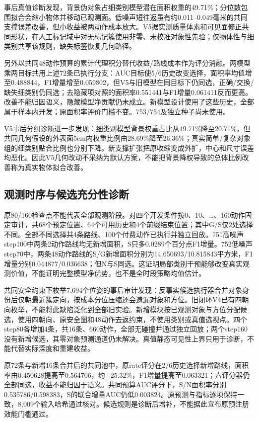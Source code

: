 \documentclass[11pt,a4paper]{article}
\begin{document}
事后真值诊断发现，背景伪对象占细类别模型潜在面积权重的49.71\%；分位数包围拟合会缩小物体并移动已观测面。低噪声短往返虽有约0.011--0.049毫米的共同支撑误差改善，但小收益被两动作成本放大。V5据实测质量体素和可见面修正共同形状，在人工标记域中对无标记簇使用非零、未校准对象性先验；仅物体性与细类别共享该规则，缺失标签恢复几何路径。

另外以共同48动作预算的累计代理积分替代收益/路线成本作为评分消融。两模型乘两目标共用上述72条已执行分支：AUC目标使5/6历史改变选择，面积率均值增至0.488844，F1增量增至0.059802，但V5与旧模型在同目标下仍同选，正确/交换/缺失细类别仍同选；去隐藏项对照的面积率0.551441与F1增量0.061411反而更高。改善不能归因语义，隐藏模型净贡献仍未成立。新模型设计使用了这些历史，全部属于样本内开发；原面积率评价门槛不变。753/754及独立种子尚未使用。

V5事后分组诊断进一步发现：细类别模型背景权重占比从49.71\%降至20.71\%，但共同几何假设的外表面5cm内权重比例由28.69\%降至26.36\%；真实简单/复杂对象组的细类别贴合比例也分别下降。新支撑扩张把原收缩变成外扩，中心和尺寸误差均恶化。因此V5几何改动不采纳为默认方案，不能把背景降权导致的总体比例改善称为真实物体拟合改善。

\subsection{观测时序与候选充分性诊断}
原80/160检查点不能代表全部观测阶段。对四个开发条件按0、10、\ldots、160动作固定审计，共68个预定位置、64个可用历史和4个前缀结束位置；其中G/S仅2处选择不同。全部不同选择共4条路线、100个付费动作已执行并独立回放。751高噪声step100中两条2动作路线均无新增面积，S只多0.0289个百分点F1增量。752低噪声step70中，两条48动作路线的S/G新增面积分别为14.650693/10.815843平方米，F1增量分别0.044877/0.036638；但N与S同选。这证明局部类别干预能够改变真实观测价值，不能证明完整模型净优势，也不是全时段策略均值估计。

共同安全约束下枚举7,694个位姿的事后审计发现：反事实候选执行器合并对象身份后仅朝最近簇定向，按成本分位压缩还会遗漏对象和方位。旧闭环V4已有四朝向枚举，不能将此缺陷泛化到全部旧实验。新增模块按已观测对象与方位分配候选，使用四朝向、原安全图和48动作去返约束，不使用类别或真值选视点。四个step80各增加4条，共16条、660动作，全部无碰撞并通过独立回放；两个step160没有新增候选，其零对象预测通道仍未解决。真值静态可见性上界只用于诊断，不能代替实际深度和重建收益。

原72条与新增16条合并后的共同池中，原rate评分在2/6历史选择新增路线，面积率由0.450628提高至0.564706，约$+25.32\%$，F1增量提高至0.063321；六评分器仍全部同选，收益不能归因于语义。共同预算AUC评分下，S/N面积率分别0.535786/0.598383，S的联合增量AUC仍低0.003824。原预测与指标逐项保持一致，8,009个输入哈希通过核对。候选规则是诊断后增补，不能据此宣布原预注册效能门槛通过。
\end{document}

